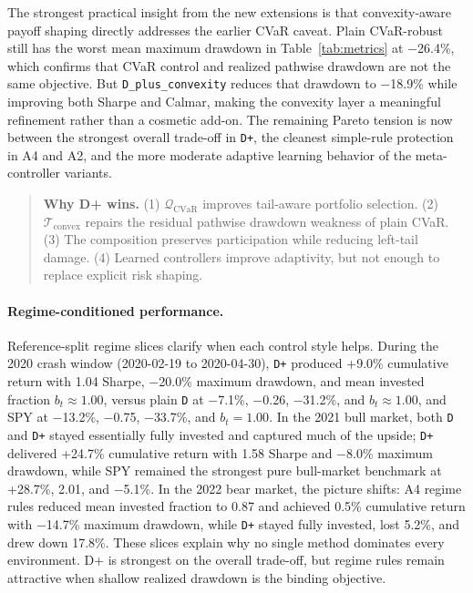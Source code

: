 \documentclass[11pt]{article}
\begin{document}
The strongest practical insight from the new extensions is that convexity-aware
payoff shaping directly addresses the earlier CVaR caveat. Plain CVaR-robust
still has the worst mean maximum drawdown in Table~\ref{tab:metrics} at
$-$26.4\%, which confirms that CVaR control and realized pathwise drawdown are
not the same objective. But \texttt{D\_plus\_convexity} reduces that drawdown
to $-$18.9\% while improving both Sharpe and Calmar, making the convexity layer
a meaningful refinement rather than a cosmetic add-on. The remaining Pareto
tension is now between the strongest overall trade-off in \texttt{D+}, the
cleanest simple-rule protection in A4 and A2, and the more moderate adaptive
learning behavior of the meta-controller variants.

\begin{quote}\small\noindent\textbf{Why D+ wins.} (1) $\mathcal{Q}_{\text{CVaR}}$ improves tail-aware portfolio selection. (2) $\mathcal{T}_{\text{convex}}$ repairs the residual pathwise drawdown weakness of plain CVaR. (3) The composition preserves participation while reducing left-tail damage. (4) Learned controllers improve adaptivity, but not enough to replace explicit risk shaping.\end{quote}

\paragraph{Regime-conditioned performance.}
Reference-split regime slices clarify when each control style helps. During the
2020 crash window (2020-02-19 to 2020-04-30), \texttt{D+} produced +9.0\%
cumulative return with 1.04 Sharpe, $-$20.0\% maximum drawdown, and mean
invested fraction $b_t \approx 1.00$, versus plain \texttt{D} at $-$7.1\%,
$-$0.26, $-$31.2\%, and $b_t \approx 1.00$, and SPY at $-$13.2\%, $-$0.75,
$-$33.7\%, and $b_t = 1.00$. In the 2021 bull market, both \texttt{D} and
\texttt{D+} stayed essentially fully invested and captured much of the upside;
\texttt{D+} delivered +24.7\% cumulative return with 1.58 Sharpe and
$-$8.0\% maximum drawdown, while SPY remained the strongest pure bull-market
benchmark at +28.7\%, 2.01, and $-$5.1\%. In the 2022 bear market, the picture
shifts: A4 regime rules reduced mean invested fraction to 0.87 and achieved
0.5\% cumulative return with $-$14.7\% maximum drawdown, while \texttt{D+}
stayed fully invested, lost 5.2\%, and drew down 17.8\%. These slices explain
why no single method dominates every environment. D+ is strongest on the
overall trade-off, but regime rules remain attractive when shallow realized
drawdown is the binding objective.
\end{document}
